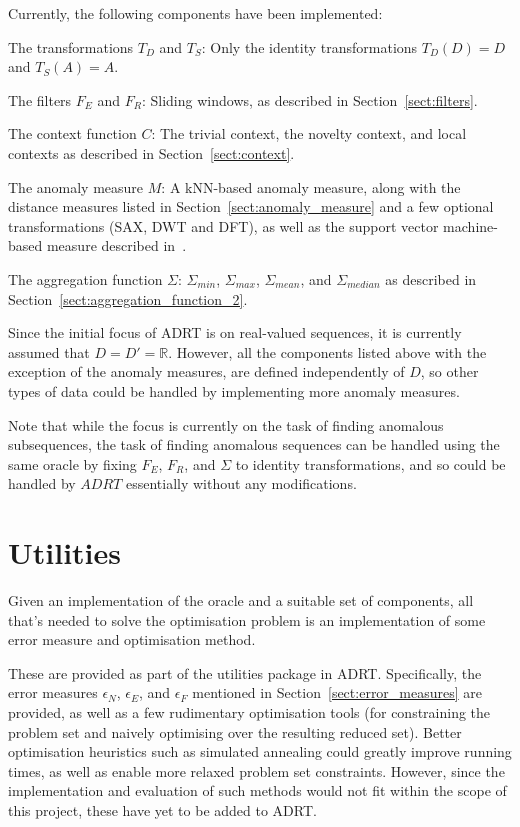 Currently, the following components have been implemented:
\begin{description}
    \item{The transformations $T_D$ and $T_S$:} Only the identity transformations $T_D(D) = D$ and $T_S(A) = A$.
    \item{The filters $F_E$ and $F_R$:} Sliding windows, as described in Section~\ref{sect:filters}.
    \item{The context function $C$:} The trivial context, the novelty context, and local contexts as described in Section~\ref{sect:context}.
    \item{The anomaly measure $M$:} A kNN-based anomaly measure, along with the distance measures listed in Section~\ref{sect:anomaly_measure} and a few optional transformations (SAX, DWT and DFT), as well as the support vector machine-based measure described in~\cite{chandola3}.
    \item{The aggregation function $\Sigma$:} $\Sigma_{min}$, $\Sigma_{max}$, $\Sigma_{mean}$, and $\Sigma_{median}$ as described in Section~\ref{sect:aggregation_function_2}.
\end{description}

Since the initial focus of ADRT is on real-valued sequences, it is currently assumed that $D = D' = \mathbb{R}$. However, all the components listed above with the exception of the anomaly measures, are defined independently of $D$, so other types of data could be handled by implementing more anomaly measures.

Note that while the focus is currently on the task of finding anomalous subsequences, the task of finding anomalous sequences can be handled using the same oracle by fixing $F_E$, $F_R$, and $\Sigma$ to identity transformations, and so could be handled by $ADRT$ essentially without any modifications.

\section{Utilities}

Given an implementation of the oracle and a suitable set of components, all that's needed to solve the optimisation problem is an implementation of some error measure and optimisation method.

These are provided as part of the utilities package in ADRT. Specifically, the error measures $\epsilon_N$, $\epsilon_E$, and $\epsilon_F$ mentioned in Section~\ref{sect:error_measures} are provided, as well as a few rudimentary optimisation tools (for constraining the problem set and naively optimising over the resulting reduced set). Better optimisation heuristics such as simulated annealing could greatly improve running times, as well as enable more relaxed problem set constraints. However, since the implementation and evaluation of such methods would not fit within the scope of this project, these have yet to be added to ADRT.


